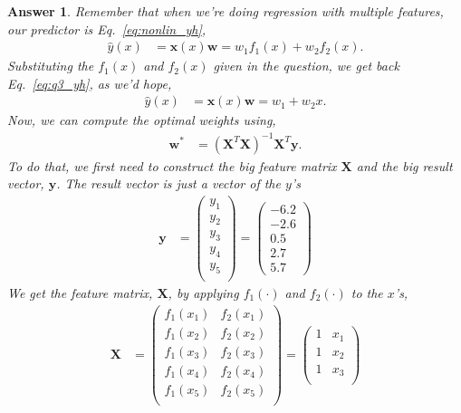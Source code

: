 \documentclass{article}
\newtheorem{answer}{Answer}
\newcommand{\bracket}[3]{\left#1 #3 \right#2}
\renewcommand{\b}{\bracket{(}{)}}
\newcommand{\x}{\mathbf{x}}
\newcommand{\y}{\mathbf{y}}
\newcommand{\X}{\mathbf{X}}
\newcommand{\w}{\mathbf{w}}
\newcommand{\wo}{\w^*}
\begin{document}
\begin{answer}
  Remember that when we're doing regression with multiple features, our predictor is Eq.~\eqref{eq:nonlin_yh},
  \begin{align}
    \hat{y}(x) &= \x(x) \w = w_1 f_1(x) + w_2 f_2(x).
  \end{align}
  Substituting the $f_1(x)$ and $f_2(x)$ given in the question, we get back Eq.~\eqref{eq:q3_yh}, as we'd hope,
  \begin{align}
    \hat{y}(x) &= \x(x) \w = w_1 + w_2 x.
  \end{align}
  Now, we can compute the optimal weights using,
  \begin{align}
    \wo &= \b{\X^T \X}^{-1} \X^T \y.
  \end{align}
  To do that, we first need to construct the big feature matrix $\X$ and the big result vector, $\y$.
  The result vector is just a vector of the $y$'s
  \begin{align}
    \y &= \begin{pmatrix}
      y_1\\
      y_2\\
      y_3\\
      y_4\\
      y_5\\
    \end{pmatrix}
    = \begin{pmatrix}
      -6.2\\
      -2.6\\
       0.5\\
       2.7\\
       5.7
    \end{pmatrix}
  \end{align}
  We get the feature matrix, $\X$, by applying $f_1(\cdot)$ and $f_2(\cdot)$ to the $x$'s,
  \begin{align}
    \X &= \begin{pmatrix}
      f_1(x_1) & f_2(x_1)\\
      f_1(x_2) & f_2(x_2)\\
      f_1(x_3) & f_2(x_3)\\
      f_1(x_4) & f_2(x_4)\\
      f_1(x_5) & f_2(x_5)\\
    \end{pmatrix}
    = \begin{pmatrix}
      1 & x_1\\
      1 & x_2\\
      1 & x_3\\

\end{pmatrix}
\end{align}
\end{answer}
\end{document}

